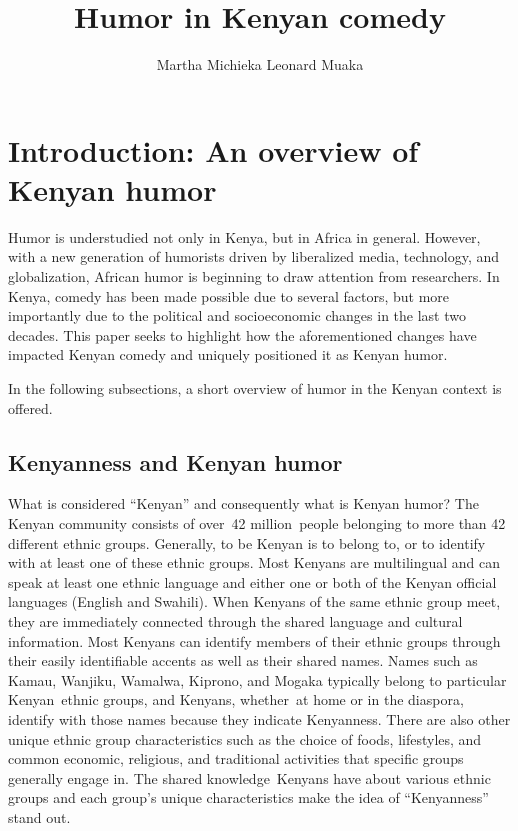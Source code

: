 \documentclass[output=paper]{langsci/langscibook}
\title{Humor in Kenyan comedy}
\author{%
 Martha Michieka   \affiliation{ East Tennessee State University}\lastand 
 Leonard Muaka\affiliation{Winston Salem State University, North Carolina}
}
\begin{document}
 

\section{Introduction: An overview of Kenyan humor}

Humor is understudied not only in Kenya, but in Africa in general. However, with a new generation of humorists driven by liberalized media, technology, and globalization, African humor is beginning to draw attention from researchers. In Kenya, comedy has been made possible due to several factors, but more importantly due to the political and socioeconomic changes in the last two decades. This paper seeks to highlight how the aforementioned changes have impacted Kenyan comedy and uniquely positioned it as Kenyan humor. 

In the following subsections, a short overview of humor in the Kenyan context is offered.

\subsection{Kenyanness and Kenyan humor}\label{sec:muaka:1.1}

What is considered “Kenyan” and consequently what is Kenyan humor? The Kenyan community consists of over~42 million~people belonging to more than 42 different ethnic groups. Generally, to be Kenyan is to belong to, or to identify with at least one of these ethnic groups. Most Kenyans are multilingual and can speak at least one ethnic language and either one or both of the Kenyan official languages (English and Swahili). When Kenyans of the same ethnic group meet, they are immediately connected through the shared language and cultural information. Most Kenyans can identify members of their ethnic groups through their easily identifiable accents as well as their shared names. Names such as Kamau, Wanjiku, Wamalwa, Kiprono, and Mogaka typically belong to particular Kenyan~ethnic groups, and Kenyans, whether~at home or in the diaspora, identify with those names because they indicate Kenyanness. There are also other unique ethnic group characteristics such as the choice of foods, lifestyles, and common economic, religious, and traditional activities that specific groups generally engage in. The shared knowledge~Kenyans have about various ethnic groups and each group’s unique characteristics make the idea of “Kenyanness” stand out.
\end{document}
